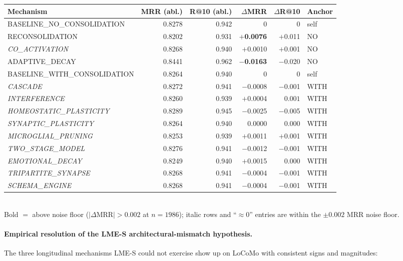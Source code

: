 \documentclass[11pt]{article}
\begin{document}
\begin{center}
\small
\begin{tabular}{lrrrrl}
\toprule
Mechanism                       & MRR (abl.) & R@10 (abl.) & $\Delta$MRR & $\Delta$R@10 & Anchor \\
\midrule
BASELINE\_NO\_CONSOLIDATION     & 0.8278 & 0.942 & 0          & 0          & self \\
RECONSOLIDATION                 & 0.8202 & 0.931 & \textbf{$+$0.0076} & $+$0.011 & NO   \\
\emph{CO\_ACTIVATION}          & 0.8268 & 0.940 & $+$0.0010 & $+$0.001 & NO   \\
ADAPTIVE\_DECAY                 & 0.8441 & 0.962 & \textbf{$-$0.0163} & $-$0.020 & NO   \\
BASELINE\_WITH\_CONSOLIDATION   & 0.8264 & 0.940 & 0          & 0          & self \\
\emph{CASCADE}                  & 0.8272 & 0.941 & $-$0.0008 & $-$0.001 & WITH \\
\emph{INTERFERENCE}             & 0.8260 & 0.939 & $+$0.0004 & $\phantom{-}0.001$ & WITH \\
\emph{HOMEOSTATIC\_PLASTICITY}  & 0.8289 & 0.945 & $-$0.0025 & $-$0.005 & WITH \\
\emph{SYNAPTIC\_PLASTICITY}     & 0.8264 & 0.940 & $\phantom{-}0.0000$ & $\phantom{-}0.000$ & WITH \\
\emph{MICROGLIAL\_PRUNING}      & 0.8253 & 0.939 & $+$0.0011 & $+$0.001 & WITH \\
\emph{TWO\_STAGE\_MODEL}        & 0.8276 & 0.941 & $-$0.0012 & $-$0.001 & WITH \\
\emph{EMOTIONAL\_DECAY}         & 0.8249 & 0.940 & $+$0.0015 & $\phantom{-}0.000$ & WITH \\
\emph{TRIPARTITE\_SYNAPSE}      & 0.8268 & 0.941 & $-$0.0004 & $-$0.001 & WITH \\
\emph{SCHEMA\_ENGINE}           & 0.8268 & 0.941 & $-$0.0004 & $-$0.001 & WITH \\
\bottomrule
\end{tabular}\\[2pt]
{\footnotesize Bold $=$ above noise floor ($|\Delta\text{MRR}| >
0.002$ at $n{=}1986$); italic rows and ``$\approx 0$'' entries are
within the $\pm 0.002$ MRR noise floor.}
\end{center}

\paragraph{Empirical resolution of the LME-S architectural-mismatch
hypothesis.}  The three longitudinal mechanisms LME-S could not
exercise show up on LoCoMo with consistent signs and magnitudes:
\end{document}
